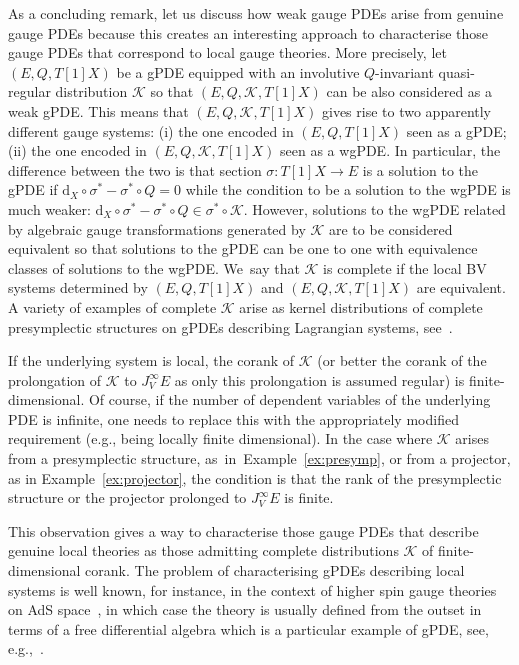 \documentclass[10pt,a4paper]{amsart}
\numberwithin{equation}{section}
\theoremstyle{definition}
\newcommand{\dx}{\mathrm{d}_X}
\def\cK{\mathcal{K}}
\begin{document}
As a concluding remark, let us discuss how weak gauge PDEs arise from
genuine gauge PDEs because this creates an interesting approach to characterise those gauge PDEs that correspond to local gauge theories. More precisely, let $(E,Q,T[1]X)$ be a gPDE equipped with an involutive $Q$-invariant quasi-regular distribution $\cK$ so that $(E,Q,\cK,T[1]X)$ can be also considered as a weak gPDE. This means that $(E,Q,\cK,T[1]X)$ gives rise to two apparently different gauge systems: (i) the one encoded in $(E,Q,T[1]X)$ seen as a gPDE; (ii) the one encoded in $(E,Q,\cK,T[1]X)$ seen as a wgPDE. In particular, the difference between the two is that section $\sigma\colon T[1]X\to E$ is a solution to the gPDE if $\dx\circ \sigma^*-\sigma^* \circ Q=0$ while the condition to be a solution to the wgPDE is much weaker: $\dx\circ \sigma^*-\sigma^* \circ Q \in \sigma^* \circ \cK$.
However, solutions to the wgPDE related by algebraic gauge transformations generated by $\cK$ are to be considered equivalent so that solutions to the gPDE can be one to one with equivalence classes of solutions to the wgPDE. We~say that $\cK$ is complete if the local BV systems determined by $(E,Q,T[1]X)$ and $(E,Q,\cK,T[1]X)$ are equivalent. A variety of examples of complete $\cK$ arise as kernel distributions of complete presymplectic structures on gPDEs describing Lagrangian systems, see~\cite{Dneprov:2022jyn,Dneprov:2024cvt, Grigoriev:2016wmk,Grigoriev:2020xec}.

If the underlying system is local, the corank of $\cK$ (or better the corank of the prolongation of $\cK$ to $J^\infty_V E$ as only this prolongation is assumed regular) is finite-dimensional. Of course, if the number of dependent variables of the underlying PDE is infinite, one needs to replace this with the appropriately modified requirement (e.g., being locally finite dimensional). In the case where $\cK$ arises from a presymplectic structure, as~in~Example~\ref{ex:presymp}, or from a projector, as in Example~\ref{ex:projector}, the condition is that the rank of the presymplectic structure or the projector prolonged to $J^\infty_VE$ is finite.

This observation gives a way to characterise those gauge PDEs that describe genuine local theories as those admitting complete distributions $\cK$ of finite-dimensional corank. The problem of characterising gPDEs describing local systems is well known, for instance, in the context of higher spin gauge theories on AdS space~\cite{Vasiliev:1999ba, Vasiliev:2003ev}, in which case the theory is usually defined from the outset in terms of a free differential algebra which is a particular example of gPDE, see, e.g.,~\cite{Boulanger:2015ova,Didenko:2019xzz,Gelfond:2019tac,Skvortsov:2015lja}.
\end{document}
